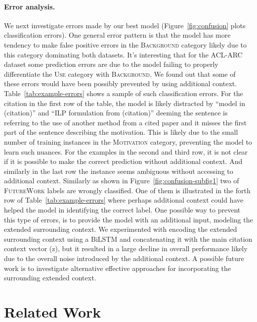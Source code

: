 \documentclass[11pt,a4paper]{article}
\newcommand{\acldata}{ACL-ARC\xspace}
\newcommand{\background}{\textsc{Background}\xspace}
\newcommand{\use}{\textsc{Use}\xspace}
\newcommand{\motivation}{\textsc{Motivation}\xspace}
\newcommand{\future}{\textsc{FutureWork}\xspace}
\begin{document}
\paragraph{Error analysis.}
We next investigate errors made by our best model (Figure~\ref{fig:confusion} plots classification errors). One general error pattern is that the model has more tendency to make false positive errors in the \background category likely due to this category dominating both datasets. It's interesting that for the \acldata dataset some prediction errors are due to the model failing to properly differentiate the \use category with \background. We found out that some of these errors would have been possibly prevented by using additional context. Table~\ref{tab:example-errors} shows a sample of such classification errors. For the citation in the first row of the table, the model is likely distracted by ``model in (citation)'' and ``ILP formulation from (citation)'' deeming the sentence is referring to the use of another method from a cited paper and it misses the first part of the sentence describing the motivation. This is likely due to the small number of training instances in the \motivation category, preventing the model to learn such nuances. For the examples in the second and third row, it is not clear if it is possible to make the correct prediction without additional context. And similarly in the last row the instance seems ambiguous without accessing to additional context. Similarly as shown in Figure~\ref{fig:confusion-subfig1} two of \future labels are wrongly classified. One of them is illustrated in the forth row of Table~\ref{tab:example-errors} where perhaps additional context could have helped the model in identifying the correct label. One possible way to prevent this type of errors, is to provide the model with an additional input, modeling the extended surrounding context. We experimented with encoding the extended surrounding context using a BiLSTM and concatenating it with the main citation context vector (z), but it resulted in a large decline in overall performance likely due to the overall noise introduced by the additional context. A possible future work is to investigate alternative effective approaches for incorporating the surrounding extended context.

\section{Related Work}
\label{sec:related}
\end{document}
